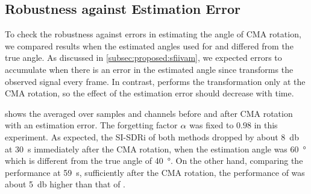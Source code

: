 \documentclass[sip,biber]{now-journal}
\begin{document}
\subsection{Robustness against Estimation Error}

To check the robustness against errors in estimating the angle of CMA rotation, we compared results when the estimated angles used for \SFIIVAo{} and \SFIIVAm{} differed from the true angle.
As discussed in \cref{subsec:proposed:sfiivam}, we expected errors to accumulate when there is an error in the estimated angle since \SFIIVAo{} transforms the observed signal every frame.
In contrast, \SFIIVAm{} performs the transformation only at the CMA rotation, so the effect of the estimation error should decrease with time.

 shows the averaged over samples and channels before and after CMA rotation with an estimation error.
The forgetting factor $\alpha$ was fixed to $0.98$ in this experiment.
As expected, the SI-SDRi of both methods dropped by about \SI{8}{\decibel} at \SI{30}{\second} immediately after the CMA rotation, when the estimation angle was \SI{60}{\degree} which is different from the true angle of \SI{40}{\degree}.
On the other hand, comparing the performance at \SI{59}{\second}, sufficiently after the CMA rotation, the performance of \SFIIVAm{} was about \SI{5}{\decibel} higher than that of \SFIIVAo{}.
\end{document}
